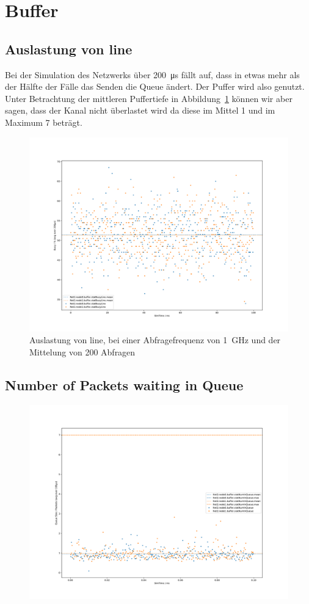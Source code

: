 \documentclass[]{scrartcl}
\begin{document}
\section{Buffer}
\subsection{Auslastung von line}
Bei der Simulation des Netzwerks \"uber \SI{200}{\micro\second} f\"allt auf,
dass in etwas mehr als der H\"alfte der F\"alle das Senden die Queue \"andert.
Der Puffer wird also genutzt. Unter Betrachtung der mittleren Puffertiefe in 
Abbildung~\ref{fig:buffer_depth} k\"onnen
wir aber sagen, dass der Kanal nicht \"uberlastet wird da diese im Mittel 1 und
im Maximum 7 betr\"agt.
\begin{figure}[ht]
    \centering
    \includegraphics[width=\columnwidth]{../../python/03_01.pdf}
    \caption{Auslastung von line, bei einer Abfragefrequenz von \SI{1}{GHz} und der Mittelung von 200 Abfragen}
\end{figure}
\newpage
\subsection{Number of Packets waiting in Queue}

\begin{figure}[ht]
    \centering
    \includegraphics[width=\columnwidth]{../../python/03_02.pdf}
    \caption{}
    \label{fig:buffer_depth}
\end{figure}
\end{document}
